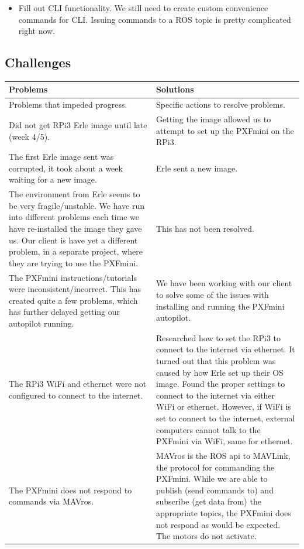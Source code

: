 \documentclass[compsoc,draftclsnofoot,onecolumn,10pt]{IEEEtran}
\begin{document}
\begin{itemize}
\begin{itemize}
	\item Fill out CLI functionality. We still need to create custom convenience commands for CLI. Issuing commands to a ROS topic is pretty complicated right now.\par
\end{itemize}

\subsection{Challenges}

\begin{tabular}{|p{0.5\linewidth}|p{0.5\linewidth}|}
	\hline
	\textbf{Problems} & \textbf{Solutions}\\
	\hline	
	Problems that impeded progress. & Specific actions to resolve problems.\\
	\hline
	Did not get RPi3 Erle image until late (week 4/5). & Getting the image allowed us to attempt to set up the PXFmini on the RPi3.\\
	\hline
	The first Erle image sent was corrupted, it took about a week waiting for a new image. & Erle sent a new image.\\
	\hline
	The environment from Erle seems to be very fragile/unstable. We have run into different problems each time we have re-installed the image they gave us. Our client is have yet a different problem, in a separate project, where they are trying to use the PXFmini. & This has not been resolved.\\
	\hline
	The PXFmini instructions/tutorials were inconsistent/incorrect. This has created quite a few problems, which has further delayed getting our autopilot running. & We have been working with our client to solve some of the issues with installing and running the PXFmini autopilot.\\
	\hline
	The RPi3 WiFi and ethernet were not configured to connect to the internet. & Researched how to set the RPi3 to connect to the internet via ethernet. It turned out that this problem was caused by how Erle set up their OS image. Found the proper settings to connect to the internet via either WiFi or ethernet. However, if WiFi is set to connect to the internet, external computers cannot talk to the PXFmini via WiFi, same for ethernet.\\
	\hline
	The PXFmini does not respond to commands via MAVros. & MAVros is the ROS api to MAVLink, the protocol for commanding the PXFmini. While we are able to publish (send commands to) and subscribe (get data from) the appropriate topics, the PXFmini does not respond as would be expected. The motors do not activate.\par

\end{tabular}
\end{itemize}
\end{document}
